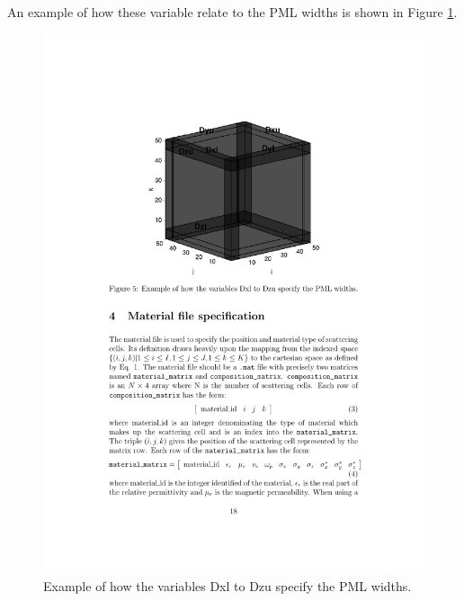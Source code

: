 \documentclass[a4paper, 12pt]{article}
\begin{document}
	An example of how these variable relate to the PML widths is shown in
	Figure \ref{fig:pml}.
	\begin{figure}[h]
		\begin{center}
			\includegraphics[width=\textwidth]{figures/4.pdf}
			\caption{Example of how the variables Dxl to Dzu specify the PML widths.}
			\label{fig:pml}
		\end{center}
	\end{figure}
\end{document}
